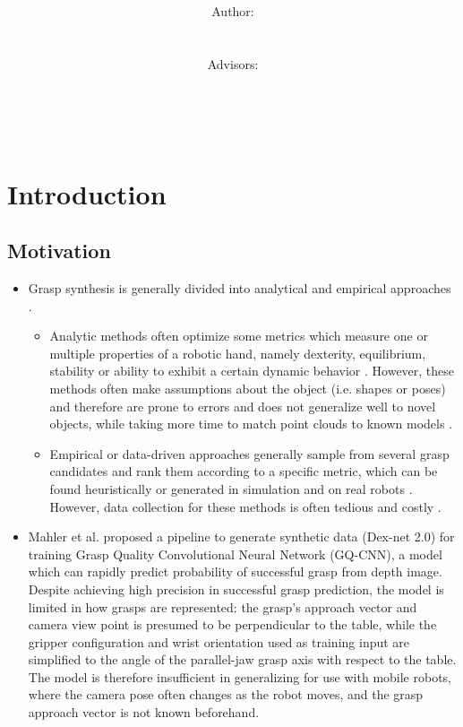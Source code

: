 \documentclass[12pt]{article}
\title{\normalsize \textsc{\hmwkAuthorSchool}   %
    \\[2.0cm]                                   %
    \HRule{0.5pt} \\                            %
    \LARGE \textbf{\uppercase{\hmwkTopic}}
    \HRule{2pt} \\ [0.5cm]                      %
    \hmwkTitle\\[0.5cm]
    \normalsize \hmwkDueDate\\
}
\author{
    \\[4.0cm]
    Author:\\
    \hmwkAuthorName\\
    \ \\
    Advisors:\\
    \hmwkAdvisorFirst\\
    \hmwkAdvisorSecond\\
    \hmwkAdvisorThird\\
}
\date{}
\begin{document}
    \maketitle
    \thispagestyle{firststyle}
    \newpage

\section{Introduction}

    \subsection{Motivation}
    \begin{itemize}
        \item Grasp synthesis is generally divided into analytical and empirical approaches \cite{Bohg2014,Sahbani2012}.
        \begin{itemize}
            \item Analytic methods often optimize some metrics which measure one or multiple properties of a robotic hand, namely dexterity, equilibrium, stability or ability to exhibit a certain dynamic behavior \cite{Bohg2014}. However, these methods often make assumptions about the object (i.e. shapes or poses) and therefore are prone to errors and does not generalize well to novel objects, while taking more time to match point clouds to known models \cite{Goldfeder2011}.
            \item Empirical or data-driven approaches generally sample from several grasp candidates and rank them according to a specific metric, which can be found heuristically or generated in simulation and on real robots \cite{Bohg2014}. However, data collection for these methods is often tedious and costly \cite{mahler2017}.
        \end{itemize}
        \item Mahler et al. \cite{mahler2017} proposed a pipeline to generate synthetic data (Dex-net 2.0) for training Grasp Quality Convolutional Neural Network (GQ-CNN), a model which can rapidly predict probability of successful grasp from depth image. Despite achieving high precision in successful grasp prediction, the model is limited in how grasps are represented: the grasp's approach vector and camera view point is presumed to be perpendicular to the table, while the gripper configuration and wrist orientation used as training input are simplified to the angle of the parallel-jaw grasp axis with respect to the table. The model is therefore insufficient in generalizing for use with mobile robots, where the camera pose often changes as the robot moves, and the grasp approach vector is not known beforehand.

\end{itemize}
\end{document}
